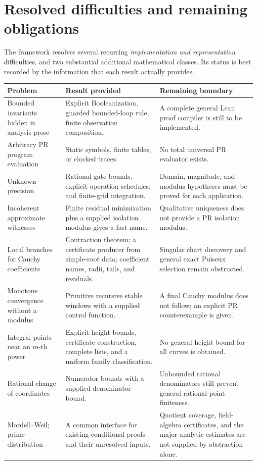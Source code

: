 \section{Resolved difficulties and remaining obligations}
\label{sec:final-status}

The framework resolves several recurring \emph{implementation and
representation} difficulties, and two substantial additional mathematical
classes.  Its status is best recorded by the information that each result
actually provides.
\begin{center}\small
\begin{longtable}{@{}P{.25\linewidth}P{.34\linewidth}P{.32\linewidth}@{}}
\toprule
Problem & Result provided & Remaining boundary\\
\midrule\endhead
Bounded invariants hidden in analysis prose & Explicit Booleanization,
guarded bounded-loop rule, finite observation composition. & A complete
general Lean proof compiler is still to be implemented.\\
Arbitrary PR program evaluation & Static symbols, finite tables, or
clocked traces. & No total universal PR evaluator exists.\\
Unknown precision & Rational gate bounds, explicit operation schedules,
and finite-grid integration. & Domain, magnitude, and modulus hypotheses
must be proved for each application.\\
Incoherent approximate witnesses & Finite residual minimization plus a
supplied isolation modulus gives a fast name. & Qualitative uniqueness
does not provide a PR isolation modulus.\\
Local branches for Cauchy coefficients & Contraction theorem; a certificate
producer from simple-root data; coefficient names, radii, tails, and residuals. & Singular chart
discovery and general exact Puiseux selection remain obstructed.\\
Monotone convergence without a modulus & Primitive recursive stable
windows with a supplied control function. & A final Cauchy modulus does
not follow; an explicit PR counterexample is given.\\
Integral points near an \(m\)-th power & Explicit height bounds,
certificate construction, complete lists, and a uniform family
classification. & No general height bound for all curves is obtained.\\
Rational change of coordinates & Numerator bounds with a supplied
denominator bound. & Unbounded rational denominators still prevent
general rational-point finiteness.\\
Mordell--Weil; prime distribution & A common interface for existing
conditional proofs and their unresolved inputs. & Quotient coverage,
field-algebra certificates, and the major analytic estimates are not
supplied by abstraction alone.\\
\bottomrule
\end{longtable}
\end{center}

